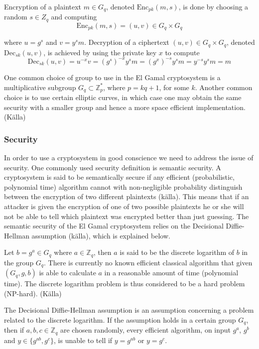 Encryption of a plaintext $m \in G_q$, denoted
$\mathrm{Enc}_{pk}(m,s)$, is done by choosing a random $s \in Z_q$ and
computing 
$$
\mathrm{Enc}_{pk}(m,s) = (u,v) \in G_q \times G_q
$$

 where $u = g^s$ and $v = y^sm$. Decryption of a ciphertext $(u,v) \in
 G_q \times G_q$, denoted $\mathrm{Dec}_{sk}(u,v)$, is achieved by
 using the private key $x$ to compute
$$
\mathrm{Dec}_{sk}(u,v) = u^{-x}v =
(g^s)^{-x}y^sm = (g^x)^{-s}y^sm = y^{-s}y^sm = m
$$

One common choice of group to use in the El Gamal cryptosystem is a
multiplicative subgroup $G_q \subset \mathbb{Z}_p^*$, where $p = kq +
1$, for some $k$. Another common choice is to use certain elliptic
curves, in which case one may obtain the same security with a smaller
group and hence a more space efficient implementation. (Källa)

\subsubsection{Security}
In order to use a cryptosystem in good conscience we need to address
the issue of security. One commonly used security definition is
semantic security. A cryptosystem is said to be semantically secure if
any efficient (probabilistic, polynomial time) algorithm cannot with
non-negligible probability distinguish between the encryption of two
different plaintexts (källa). This means that if an attacker is given
the encryption of one of two possible plaintexts he or she will not be
able to tell which plaintext was encrypted better than just
guessing. The semantic security of the El Gamal cryptosystem relies on
the Decisional Diffie-Hellman assumption (källa), which is explained
below.

Let $b = g^a \in G_q$ where $a \in \mathbb{Z}_q$, then $a$ is said to
be the discrete logarithm of $b$ in the group $G_q$. There is
currently no known efficient classical algorithm that given $(G_q, g,
b)$ is able to calculate $a$ in a reasonable amount of time
(polynomial time). The discrete logarithm problem is thus considered
to be a hard problem (NP-hard). (Källa)

The Decisional Diffie-Hellman assumption is an assumption concerning a
problem related to the discrete logarithm. If the assumption holds in
a certain group $G_q$, then if $a,b,c \in \mathbb{Z}_q$ are chosen
randomly, every efficient algorithm, on input $g^a$, $g^b$ and $y \in
\{g^{ab}, g^c\}$, is unable to tell if $y = g^{ab}$ or $y = g^c$.

